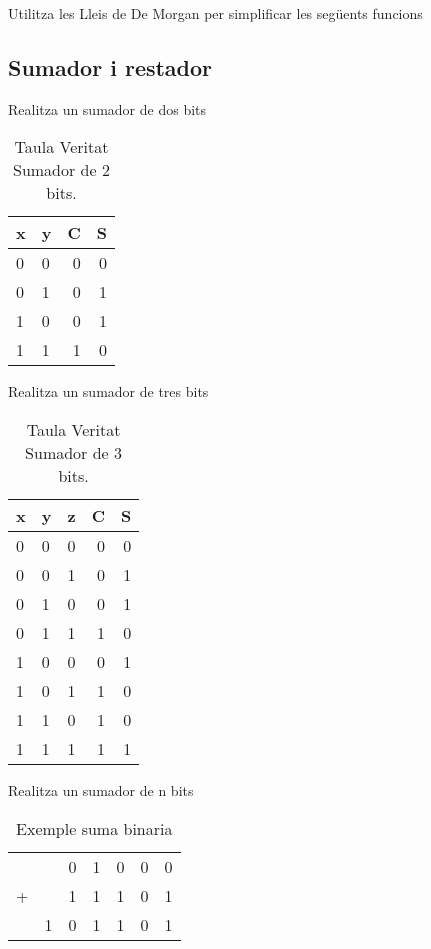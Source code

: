 \documentclass[a4paper]{article}
\begin{document}
Utilitza les Lleis de De Morgan per simplificar les següents funcions

\subsection{Sumador i restador}

Realitza un sumador de dos bits

\begin{table}[!htbp]
\centering
\begin{tabular}{ll|rr}
x&y&C&S \\\hline
0&0&0&0 \\
0&1&0&1 \\
1&0&0&1 \\
1&1&1&0 \\

\end{tabular}
\caption{\label{tab:widgets}Taula Veritat Sumador de 2 bits.}
\end{table}

Realitza un sumador de tres bits

\begin{table}[!htbp]
\centering
\begin{tabular}{lll|rr}
x&y&z&C&S \\\hline
0&0&0&0&0 \\
0&0&1&0&1 \\
0&1&0&0&1 \\
0&1&1&1&0 \\
1&0&0&0&1 \\
1&0&1&1&0 \\
1&1&0&1&0 \\
1&1&1&1&1 \\

\end{tabular}
\caption{\label{tab:widgets}Taula Veritat Sumador de 3 bits.}
\end{table}

Realitza un sumador de n bits

\begin{table}[!htbp]
\centering
\begin{tabular}{lllllll}
 &&0&1&0&0&0 \\
+&&1&1&1&0&1 \\\hline
&1&0&1&1&0&1 \\

\end{tabular}
\caption{\label{tab:widgets}Exemple suma binaria}
\end{table}
\end{document}
